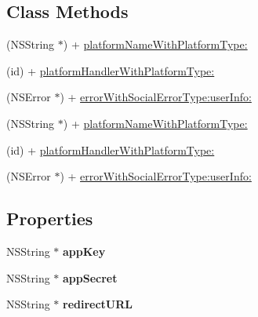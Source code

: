 \subsection*{Class Methods}
\begin{DoxyCompactItemize}
\item 
(N\+S\+String $\ast$) + \mbox{\hyperlink{interface_u_m_social_platform_config_a5ac56d539f835df37ca8299a93368433}{platform\+Name\+With\+Platform\+Type\+:}}
\item 
(id) + \mbox{\hyperlink{interface_u_m_social_platform_config_a466845145ae4dcbcb667ef4c31edc989}{platform\+Handler\+With\+Platform\+Type\+:}}
\item 
(N\+S\+Error $\ast$) + \mbox{\hyperlink{interface_u_m_social_platform_config_afbe21075c884689ef025a2dae8cc6851}{error\+With\+Social\+Error\+Type\+:user\+Info\+:}}
\item 
(N\+S\+String $\ast$) + \mbox{\hyperlink{interface_u_m_social_platform_config_a5ac56d539f835df37ca8299a93368433}{platform\+Name\+With\+Platform\+Type\+:}}
\item 
(id) + \mbox{\hyperlink{interface_u_m_social_platform_config_a466845145ae4dcbcb667ef4c31edc989}{platform\+Handler\+With\+Platform\+Type\+:}}
\item 
(N\+S\+Error $\ast$) + \mbox{\hyperlink{interface_u_m_social_platform_config_afbe21075c884689ef025a2dae8cc6851}{error\+With\+Social\+Error\+Type\+:user\+Info\+:}}
\end{DoxyCompactItemize}
\subsection*{Properties}
\begin{DoxyCompactItemize}
\item 
\mbox{\label{interface_u_m_social_platform_config_a0dc6667798ef38bea427e8c77b587bcc}} 
N\+S\+String $\ast$ {\bfseries app\+Key}
\item 
\mbox{\label{interface_u_m_social_platform_config_a16673c564b36811826fbf9c90c658a95}} 
N\+S\+String $\ast$ {\bfseries app\+Secret}
\item 
\mbox{\label{interface_u_m_social_platform_config_a774b062e3277c9949c9f754fa5b99611}} 
N\+S\+String $\ast$ {\bfseries redirect\+U\+RL}
\end{DoxyCompactItemize}


